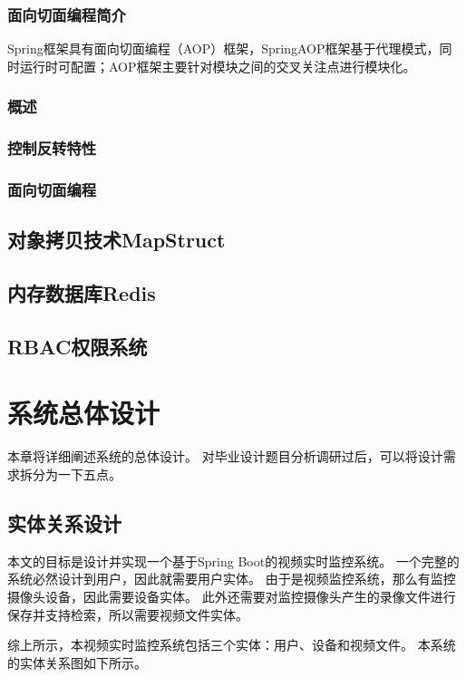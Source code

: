 \subsection{面向切面编程简介}
Spring框架具有面向切面编程（AOP）框架，SpringAOP框架基于代理模式，同时运行时可配置；AOP框架主要针对模块之间的交叉关注点进行模块化。


\subsection{概述}

\subsection{控制反转特性}

\subsection{面向切面编程}


\section{对象拷贝技术MapStruct}

\section{内存数据库Redis}

\section{RBAC权限系统}


\chapter{系统总体设计}
本章将详细阐述系统的总体设计。
对毕业设计题目分析调研过后，可以将设计需求拆分为一下五点。


\section{实体关系设计}
本文的目标是设计并实现一个基于Spring Boot的视频实时监控系统。
一个完整的系统必然设计到用户，因此就需要用户实体。
由于是视频监控系统，那么有监控摄像头设备，因此需要设备实体。
此外还需要对监控摄像头产生的录像文件进行保存并支持检索，所以需要视频文件实体。

综上所示，本视频实时监控系统包括三个实体：用户、设备和视频文件。
本系统的实体关系图如下所示。

